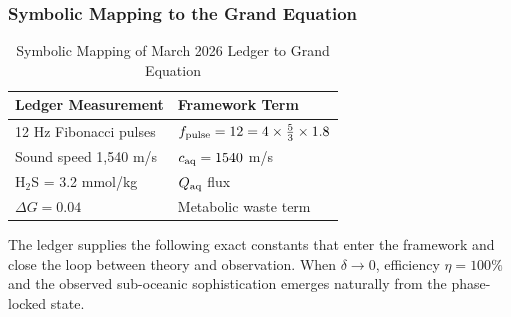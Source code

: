 \documentclass[11pt,a4paper]{article}
\begin{document}
\subsubsection{Symbolic Mapping to the Grand Equation}

\begin{table}[h]
\centering
\begin{tabular}{ll}
\toprule
Ledger Measurement & Framework Term \\
\midrule
12 Hz Fibonacci pulses & \( f_{\rm pulse} = 12 = 4 \times \frac{5}{3} \times 1.8 \) \\
Sound speed 1,540 m/s & \( c_{\rm aq} = 1540 \) m/s \\
H\(_2\)S = 3.2 mmol/kg & \( Q_{\rm aq} \) flux \\
\(\Delta G = 0.04\) & Metabolic waste term \\
\bottomrule
\end{tabular}
\caption{Symbolic Mapping of March 2026 Ledger to Grand Equation}
\end{table}

The ledger supplies the following exact constants that enter the framework and close the loop between theory and observation. When \(\delta \to 0\), efficiency \(\eta = 100\%\) and the observed sub-oceanic sophistication emerges naturally from the phase-locked state.
\end{document}
